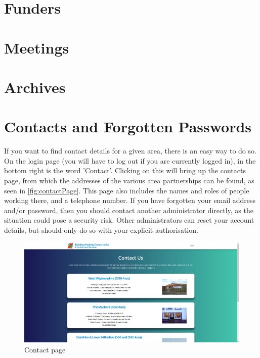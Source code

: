 \documentclass{bhcguides}
\begin{document}
\section{Funders}
\label{sec:funders}

\section{Meetings}
\label{sec:meetings}

\section{Archives}
\label{sec:archives}

\section{Contacts and Forgotten Passwords}
\label{sec:contacts}

If you want to find contact details for a given area, there is an easy way to do so. On the login page (you will have to log out if you are currently logged in), in the bottom right is the word 'Contact'. Clicking on this will bring up the contacts page, from which the addresses of the various area partnerships can be found, as seen in \autoref{fig:contactPage}. This page also includes the names and roles of people working there, and a telephone number. If you have forgotten your email address and/or password, then you should contact another administrator directly, as the situation could pose a security risk. Other administrators can reset your account details, but should only do so with your explicit authorisation.

\begin{figure}[h]
 \centerline{\includegraphics[width=\textwidth, height=\textheight, keepaspectratio]{contactpage.png}}
 \caption{Contact page}
 \label{fig:contactPage}
\end{figure}
\end{document}
